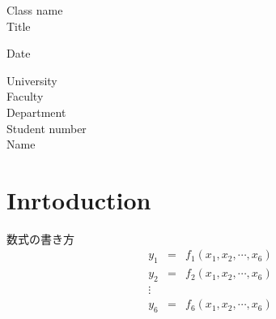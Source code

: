 \documentclass [titlepage, a4j, 11pt] {jsarticle}
\begin{document}
\begin {titlepage}
	\begin {center}
		\vspace {20mm}
		{\Large Class name} \\
		\vspace {5mm}
		\vspace {60mm}
		{\huge Title} 
		
		\vspace {100mm}
		{\Large Date} \\
		\vspace {15mm}
	
	{\Large University} \\
	{\Large Faculty} \\
	{\Large Department} \\
	{\Large Student number} \\
	{\Large Name} \\
	\end {center}
\end {titlepage}







\setcounter{page}{1}
\section{Inrtoduction}
数式の書き方
\begin{eqnarray}
y_1&=&f_1(x_1,x_2,\cdots,x_6) \nonumber \\
y_2&=&f_2(x_1,x_2,\cdots,x_6)\nonumber \\
\vdots \\
y_6&=&f_6(x_1,x_2,\cdots,x_6)\nonumber 
\end{eqnarray}
\end{document}
